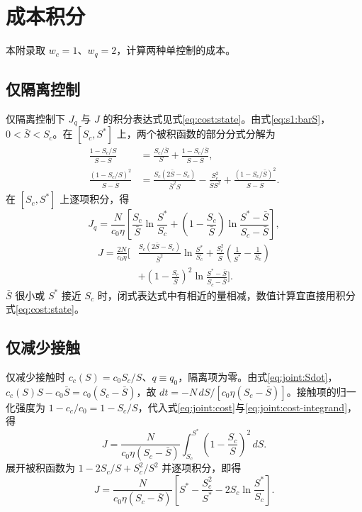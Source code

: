 \section{成本积分}
\label{app:cost}
本附录取 $w_c=1$、$w_q=2$，计算两种单控制的成本。
\subsection{仅隔离控制}
仅隔离控制下 $J_q$ 与 $J$ 的积分表达式见式\eqref{eq:cost:state}。由式\eqref{eq:s1:barS}，$0<\bar S<S_c$。在 $[S_c,S^*]$ 上，两个被积函数的部分分式分解为
\begin{align*}
\frac{1-S_c/S}{S-\bar S}
&=\frac{S_c/\bar S}{S}
 +\frac{1-S_c/\bar S}{S-\bar S},\\
\frac{(1-S_c/S)^2}{S-\bar S}
&=\frac{S_c(2\bar S-S_c)}{\bar S^2S}
-\frac{S_c^2}{\bar S S^2}
+\frac{(1-S_c/\bar S)^2}{S-\bar S}.
\end{align*}
在 $[S_c,S^*]$ 上逐项积分，得
\begin{equation}
J_q=\frac{N}{c_0\eta}\left[
\frac{S_c}{\bar S}\ln\frac{S^*}{S_c}
+\left(1-\frac{S_c}{\bar S}\right)\ln\frac{S^*-\bar S}{S_c-\bar S}\right],
\label{eq:cost:closed-linear}
\end{equation}
\begin{equation}
\begin{split}
J=\frac{2N}{c_0\eta}\bigg[&
\frac{S_c(2\bar S-S_c)}{\bar S^2}\ln\frac{S^*}{S_c}
+\frac{S_c^2}{\bar S}\left(\frac1{S^*}-\frac1{S_c}\right)\\
&+\left(1-\frac{S_c}{\bar S}\right)^2
\ln\frac{S^*-\bar S}{S_c-\bar S}\bigg].
\end{split}
\label{eq:cost:closed}
\end{equation}
$\bar S$ 很小或 $S^*$ 接近 $S_c$ 时，闭式表达式中有相近的量相减，数值计算宜直接用积分式\eqref{eq:cost:state}。

\subsection{仅减少接触}
仅减少接触时 $c_c(S)=c_0S_c/S$、$q\equiv q_0$，隔离项为零。由式\eqref{eq:joint:Sdot}，$c_c(S)S-c_0\bar S=c_0(S_c-\bar S)$，故 $dt=-N\,dS/[c_0\eta(S_c-\bar S)]$。接触项的归一化强度为 $1-c_c/c_0=1-S_c/S$，代入式\eqref{eq:joint:cost}与\eqref{eq:joint:cost-integrand}，得
\[
J=\frac{N}{c_0\eta(S_c-\bar S)}\int_{S_c}^{S^*}\left(1-\frac{S_c}{S}\right)^2\,dS.
\]
展开被积函数为 $1-2S_c/S+S_c^2/S^2$ 并逐项积分，即得
\begin{equation}
J=\frac{N}{c_0\eta(S_c-\bar S)}
\left[S^*-\frac{S_c^2}{S^*}-2S_c\ln\frac{S^*}{S_c}\right].
\label{eq:joint:contact-cost}
\end{equation}

